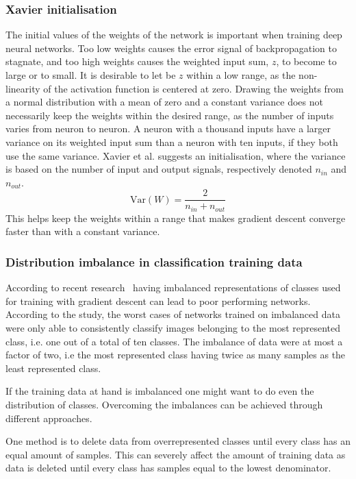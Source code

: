 \subsubsection{Xavier initialisation}
The initial values of the weights of the network is important when training deep neural networks. Too low weights causes the error signal of backpropagation to stagnate, and too high weights causes the weighted input sum, $z$, to become to large or to small. It is desirable to let be $z$ within a low range, as the non-linearity of the activation function is centered at zero.
Drawing the weights from a normal distribution with a mean of zero and a constant variance does not necessarily keep the weights within the desired range, as the number of inputs varies from neuron to neuron. A neuron with a thousand inputs have a larger variance on its weighted input sum than a neuron with ten inputs, if they both use the same variance.
Xavier et al. \cite{DBLP:journals/jmlr/GlorotB10} suggests an initialisation, where the variance is based on the number of input and output signals, respectively denoted $n_{in}$ and $n_{out}$.
$$ \text{Var}(W) = \frac{2}{n_{in} + n_{out}} $$
This helps keep the weights within a range that makes gradient descent converge faster than with a constant variance.

\subsubsection{Distribution imbalance in classification training data}
\label{sub:data-req}
According to recent research~\cite{balanced-classes} having imbalanced representations of classes used for training with gradient descent can lead to poor performing networks. According to the study, the worst cases of networks trained on imbalanced data were only able to consistently classify images belonging to the most represented class, i.e. one out of a total of ten classes. The imbalance of data were at most a factor of two, i.e the most represented class having twice as many samples as the least represented class.

If the training data at hand is imbalanced one might want to do even the distribution of classes. Overcoming the imbalances can be achieved through different approaches.

One method is to delete data from overrepresented classes until every class has an equal amount of samples. This can severely affect the amount of training data as data is deleted until every class has samples equal to the lowest denominator.

